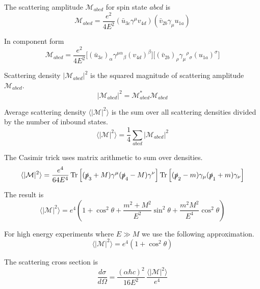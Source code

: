 The scattering amplitude $\mathcal M_{abcd}$ for spin state $abcd$ is
\begin{equation*}
\mathcal{M}_{abcd}=\frac{e^2}{4E^2}(\bar{u}_{3c}\gamma^\mu v_{4d})(\bar{v}_{2b}\gamma_\mu u_{1a})
\end{equation*}

In component form
\begin{equation*}
\mathcal{M}_{abcd}=\frac{e^2}{4E^2}
\bigl[
(\bar{u}_{3c})_\alpha\gamma^{\mu\alpha}{}_\beta(v_{4d})^\beta
\bigr]
\bigl[
(\bar{v}_{2b})_\rho\gamma_\mu{}^\rho{}_\sigma(u_{1a})^\sigma
\bigr]
\end{equation*}

Scattering density $|\mathcal M_{abcd}|^2$ is the squared magnitude
of scattering amplitude $\mathcal M_{abcd}$.
\begin{equation*}
|\mathcal M_{abcd}|^2=\mathcal M_{abcd}^*\mathcal M_{abcd}
\end{equation*}

Average scattering density $\langle|\mathcal{M}|^2\rangle$
is the sum over all scattering densities divided by the number of inbound states.
\begin{equation*}
\langle|\mathcal{M}|^2\rangle
=\frac{1}{4}\sum_{abcd}\left|\mathcal{M}_{abcd}\right|^2
\end{equation*}

The Casimir trick uses matrix arithmetic to sum over densities.
\begin{equation*}
\langle|\mathcal{M}|^2\rangle
=\frac{e^4}{64E^4}
\operatorname{Tr}\left[(\slashed{p}_3+M)\gamma^\mu(\slashed{p}_4-M)\gamma^\nu\right]
\operatorname{Tr}\left[(\slashed{p}_2-m)\gamma_\mu(\slashed{p}_1+m)\gamma_\nu\right]
\end{equation*}

The result is
\begin{equation*}
\langle|\mathcal{M}|^2\rangle
=e^4\left(1+\cos^2\theta+\frac{m^2+M^2}{E^2}\sin^2\theta+\frac{m^2M^2}{E^4}\cos^2\theta\right)
\end{equation*}

For high energy experiments where $E\gg M$ we use the following approximation.
\begin{equation*}
\langle|\mathcal{M}|^2\rangle=e^4\left(1+\cos^2\theta\right)
\end{equation*}

The scattering cross section is
\begin{equation*}
\frac{d\sigma}{d\Omega}
=\frac{(\alpha\hbar c)^2}{16E^2}\,
\frac{\langle|\mathcal{M}|^2\rangle}{e^4}
\end{equation*}

